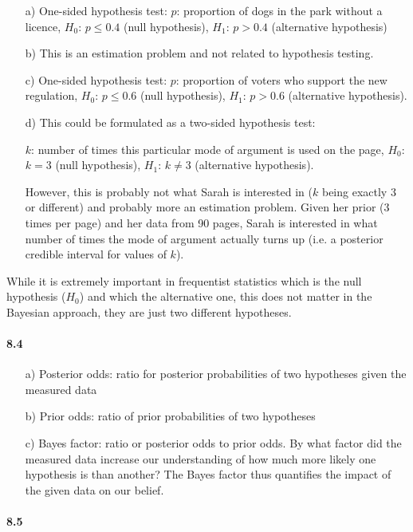 \documentclass[fontsize=11pt,DIV=18,parskip=half]{scrartcl}
\begin{document}
\begin{enumerate}
\item[a)] One-sided hypothesis test: $p$: proportion of dogs in the park without a licence, $H_0$: $p\leq0.4$ (null hypothesis), $H_1$: $p>0.4$ (alternative hypothesis)
\item[b)] This is an estimation problem and not related to hypothesis testing.
\item[c)] One-sided hypothesis test: $p$: proportion of voters who support the new regulation, $H_0$: $p\leq0.6$ (null hypothesis), $H_1$: $p>0.6$ (alternative hypothesis).
\item[d)] This could be formulated as a two-sided hypothesis test: 

$k$: number of times this particular mode of argument is used on the page, $H_0$: $k=3$ (null hypothesis), $H_1$: $k\neq3$ (alternative hypothesis).

However, this is probably not what Sarah is interested in ($k$ being exactly $3$ or different) and probably more an estimation problem. Given her prior (3 times per page) and her data from 90 pages, Sarah is interested in what number of times the mode of argument actually turns up (i.e. a posterior credible interval for values of $k$).
\end{enumerate}

While it is extremely important in frequentist statistics which is the null hypothesis ($H_0$) and which the alternative one, this does not matter in the Bayesian approach, they are just two different hypotheses.


\paragraph{8.4} 

\begin{enumerate}
\item[a)] Posterior odds: ratio for posterior probabilities of two hypotheses given the measured data
\item[b)] Prior odds: ratio of prior probabilities of two hypotheses
\item[c)] Bayes factor: ratio or posterior odds to prior odds. By what factor did the measured data increase our understanding of how much more likely one hypothesis is than another? The Bayes factor thus quantifies the impact of the given data on our belief.
\end{enumerate}


\paragraph{8.5} 
\end{document}
